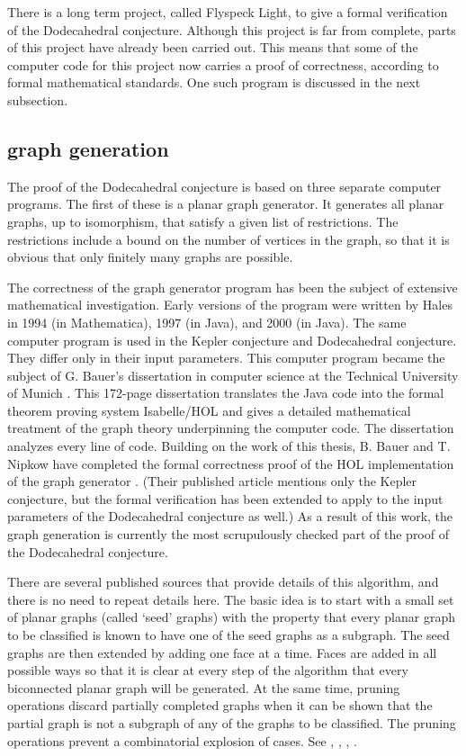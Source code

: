 There is a long term project, 
called Flyspeck Light, to give a formal verification of the
Dodecahedral conjecture.  Although this project is far from
complete, parts of this project have already
been carried out.  This means that some of the computer code
for this project now carries a proof of correctness,
according to formal mathematical standards.  One such
program is discussed in the next subsection.




\subsection{graph generation}\label{sec:gg}

The proof of the Dodecahedral conjecture is based on three separate
computer programs.  The first of these is a planar graph generator.
It generates all planar graphs, up to isomorphism, that satisfy
a given list of restrictions.  The restrictions include a bound on
the number of vertices in the graph, so that it is obvious that only finitely many graphs are possible.

The correctness of the graph generator program has been the 
subject of extensive
mathematical investigation.  Early versions of the program were
written by Hales in 1994 (in Mathematica), 1997 (in Java), and 2000 (in Java).  The same computer program is used in the Kepler conjecture
and Dodecahedral conjecture.  They differ only in their input parameters.
This computer program became the subject of  G. Bauer's
dissertation in computer science at the Technical University of Munich
\cite{Bauer}.
This 172-page dissertation translates the Java code into the
formal theorem proving system Isabelle/HOL and gives a detailed 
mathematical treatment of the graph theory underpinning the
computer code.  The dissertation analyzes every line of code.  
Building on the work of this thesis, B. Bauer
and T. Nipkow have completed the formal correctness proof of the HOL implementation
of the graph generator \cite{BN06}.  (Their published article mentions
only the Kepler conjecture, but the formal verification 
has been extended to
apply to the input parameters of the Dodecahedral conjecture as well.)
As a result of this work, the graph generation is currently the
most scrupulously checked part of the proof of the Dodecahedral
conjecture.

There are several published sources that provide details of this
algorithm, and there is no need to repeat details here.   The basic idea is to start
with a small set of planar graphs  (called `seed' graphs) with
the property that every planar graph to be classified is known to have
one of the seed graphs as a subgraph.  The seed graphs are then
extended by adding one face at a time.  Faces are added in all
possible ways so that it is clear at every step of the algorithm
that every biconnected planar graph will be generated.  At the same time,
pruning operations discard partially completed graphs when it can
be shown that the partial graph is not a subgraph of any of the
graphs to be classified.  The pruning operations prevent a
combinatorial explosion of cases.
See \cite[\S5]{alg}, \cite[\S19]{DCG}, \cite{Bauer}, \cite{BN06}.


